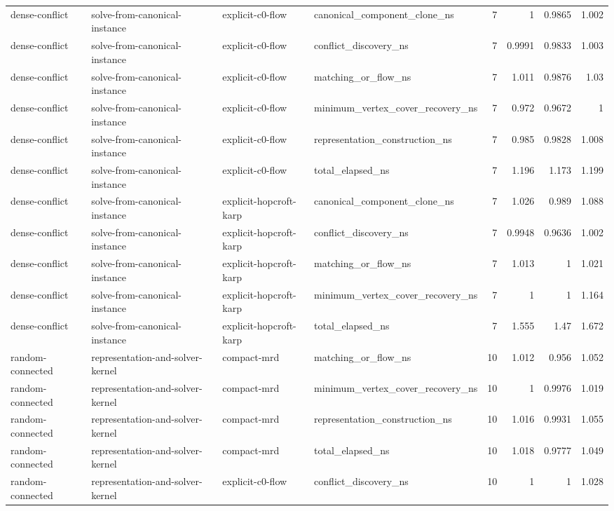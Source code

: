 \begin{table}[t]
\begin{tabular}{llllrrrr}
dense-conflict & solve-from-canonical-instance & explicit-c0-flow & canonical\_component\_clone\_ns & 7 & 1 & 0.9865 & 1.002 \\
dense-conflict & solve-from-canonical-instance & explicit-c0-flow & conflict\_discovery\_ns & 7 & 0.9991 & 0.9833 & 1.003 \\
dense-conflict & solve-from-canonical-instance & explicit-c0-flow & matching\_or\_flow\_ns & 7 & 1.011 & 0.9876 & 1.03 \\
dense-conflict & solve-from-canonical-instance & explicit-c0-flow & minimum\_vertex\_cover\_recovery\_ns & 7 & 0.972 & 0.9672 & 1 \\
dense-conflict & solve-from-canonical-instance & explicit-c0-flow & representation\_construction\_ns & 7 & 0.985 & 0.9828 & 1.008 \\
dense-conflict & solve-from-canonical-instance & explicit-c0-flow & total\_elapsed\_ns & 7 & 1.196 & 1.173 & 1.199 \\
dense-conflict & solve-from-canonical-instance & explicit-hopcroft-karp & canonical\_component\_clone\_ns & 7 & 1.026 & 0.989 & 1.088 \\
dense-conflict & solve-from-canonical-instance & explicit-hopcroft-karp & conflict\_discovery\_ns & 7 & 0.9948 & 0.9636 & 1.002 \\
dense-conflict & solve-from-canonical-instance & explicit-hopcroft-karp & matching\_or\_flow\_ns & 7 & 1.013 & 1 & 1.021 \\
dense-conflict & solve-from-canonical-instance & explicit-hopcroft-karp & minimum\_vertex\_cover\_recovery\_ns & 7 & 1 & 1 & 1.164 \\
dense-conflict & solve-from-canonical-instance & explicit-hopcroft-karp & total\_elapsed\_ns & 7 & 1.555 & 1.47 & 1.672 \\
random-connected & representation-and-solver-kernel & compact-mrd & matching\_or\_flow\_ns & 10 & 1.012 & 0.956 & 1.052 \\
random-connected & representation-and-solver-kernel & compact-mrd & minimum\_vertex\_cover\_recovery\_ns & 10 & 1 & 0.9976 & 1.019 \\
random-connected & representation-and-solver-kernel & compact-mrd & representation\_construction\_ns & 10 & 1.016 & 0.9931 & 1.055 \\
random-connected & representation-and-solver-kernel & compact-mrd & total\_elapsed\_ns & 10 & 1.018 & 0.9777 & 1.049 \\
random-connected & representation-and-solver-kernel & explicit-c0-flow & conflict\_discovery\_ns & 10 & 1 & 1 & 1.028 \\

\end{tabular}
\end{table}
